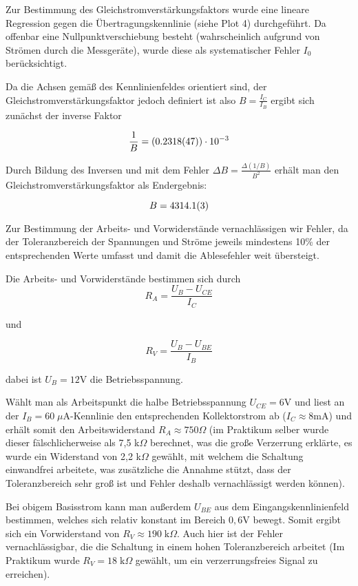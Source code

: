 Zur Bestimmung des Gleichstromverstärkungsfaktors wurde eine lineare Regression
gegen die Übertragungskennlinie (siehe Plot 4) durchgeführt. Da offenbar eine
Nullpunktverschiebung besteht (wahrscheinlich aufgrund von Strömen durch die
Messgeräte), wurde diese als systematischer Fehler $I_0$ berücksichtigt.

Da die Achsen gemäß des Kennlinienfeldes orientiert sind, der
Gleichstromverstärkungsfaktor jedoch definiert ist also $B = \frac{I_C}{I_B}$
ergibt sich zunächst der inverse Faktor

\begin{equation}
  \frac{1}{B} = (\num{0.2318+-0.0047}) \cdot 10^{-3}
\end{equation}

Durch Bildung des Inversen und mit dem Fehler $\Delta B =
\frac{\Delta(1/B)}{B^2}$ erhält man den Gleichstromverstärkungsfaktor als
Endergebnis:

\begin{equation}
  B = \num{4314.1+-0.3}
\end{equation}

Zur Bestimmung der Arbeits- und Vorwiderstände vernachlässigen wir Fehler, da
der Toleranzbereich der Spannungen und Ströme jeweils mindestens 10\% der
entsprechenden Werte umfasst und damit die Ablesefehler weit übersteigt.

Die Arbeits- und Vorwiderstände bestimmen sich durch
\begin{equation}
  R_A = \frac{U_B - U_{CE}}{I_C}
\end{equation}

und

\begin{equation}
  R_V = \frac{U_B - U_{BE}}{I_B}
\end{equation}

dabei ist $U_B = 12$V die Betriebsspannung.

Wählt man als Arbeitspunkt die halbe Betriebsspannung $U_{CE} = 6$V und liest
an der $I_B = 60\;\mu\text{A}$-Kennlinie den entsprechenden Kollektorstrom ab
($I_C \approx 8$mA) und erhält somit den Arbeitswiderstand
$R_A \approx 750 \Omega$ (im Praktikum selber wurde dieser fälschlicherweise
als 7{,}5 k$\Omega$ berechnet, was die große Verzerrung erklärte, es wurde ein
Widerstand von 2{,}2 k$\Omega$ gewählt, mit welchem die Schaltung einwandfrei
arbeitete, was zusätzliche die Annahme stützt, dass der Toleranzbereich sehr
groß ist und Fehler deshalb vernachlässigt werden können).

Bei obigem Basisstrom kann man außerdem $U_{BE}$ aus dem Eingangskennlinienfeld
bestimmen, welches sich relativ konstant im Bereich $0{,}6$V bewegt. Somit
ergibt sich ein Vorwiderstand von $R_V \approx 190\;\text{k}\Omega$. Auch hier
ist der Fehler vernachlässigbar, die die Schaltung in einem hohen
Toleranzbereich arbeitet (Im Praktikum wurde $R_V = 18 \;\text{k}\Omega$
gewählt, um ein verzerrungsfreies Signal zu erreichen).
\newpage
